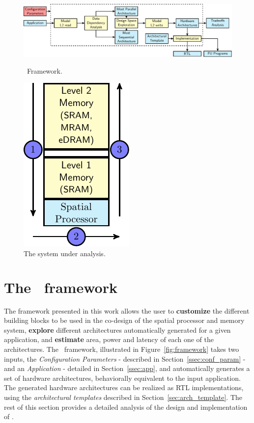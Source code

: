 \begin{figure}[!ht]
\begin{minipage}{.7\textwidth}
\includegraphics[width=\textwidth,left]{images/framework_v2.pdf}
  \caption{\small \frameworkname~Framework.}{}
  \label{fig:framework}
\end{minipage}%
\begin{minipage}{.3\textwidth}
    \centering
\includegraphics[width=.5\textwidth]{images/architecture_v2.pdf}
\caption{\small The system under analysis.
    }
\label{fig:system}
\end{minipage}
\squeezeup
\squeezeup
\end{figure}
\section{The \frameworkname~framework}
\label{sec:framework}
The framework presented in this work allows the user to \textbf{customize} the different building blocks to be used in the co-design of the spatial processor and memory system, \textbf{explore} different architectures automatically generated for a given application, and \textbf{estimate} area, power and latency of each one of the architectures. The \frameworkname~framework, illustrated in Figure~\ref{fig:framework} takes two inputs, the \textit{Configuration Parameters} - described in Section~\ref{ssec:conf_param} - and an \textit{Application} - detailed in Section~\ref{ssec:app}, and automatically generates a set of hardware architectures, behaviorally equivalent to the input application.
The generated hardware architectures can be realized as RTL implementations, using the \textit{architectural templates} described in Section~\ref{sec:arch_template}.
The rest of this section provides a detailed analysis of the design and implementation of \frameworkname.

